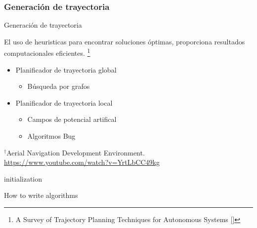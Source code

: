 \documentclass[
  24pt, %
  aspectratio=169, %
]{beamer}
\begin{document}
\subsubsection{Generación de trayectoria}
\begin{frame}{Generación de trayectoria}
  \begin{minipage}{0.47\textwidth}

    El uso de heuristicas para encontrar soluciones óptimas, proporciona resultados computacionales eficientes. \footnote{A Survey of Trajectory Planning Techniques for Autonomous Systems [\cite{Mir2022}]} 
    \bigskip %
    \begin{itemize}
    \item Planificador de trayectoria global
      \begin{itemize}
      \item Búsqueda por grafos
      \end{itemize}
      \bigskip %
    \item Planificador de trayectoria local
      \begin{itemize}
      \item Campos de potencial artifical
      \item Algoritmos Bug
      \end{itemize}
    \end{itemize}
    \bigskip %
  \end{minipage}
  \hspace{0.2cm}
  \begin{minipage}{0.5\textwidth}
    \centering
    \rule{0in}{1.2em}$^\dag$\scriptsize Aerial Navigation Development Environment.\\
    \tiny \url{https://www.youtube.com/watch?v=YrtLbCC49kg} 
  \end{minipage}
  
\end{frame}

\begin{frame}
  \begin{algorithm}[H]
    initialization\;
    \caption{How to write algorithms}
  \end{algorithm}
\end{frame}
\end{document}

